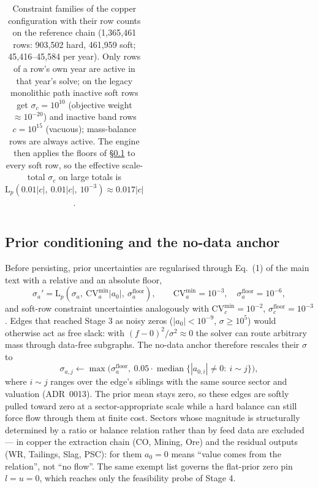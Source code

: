 \documentclass[11pt]{article}
\newcommand{\Lp}[1]{\mathrm{L}_p\!\left(#1\right)}
\begin{document}
\begin{table}[h]
\begin{tabular}{@{}p{3.1cm}p{1.5cm}p{4.3cm}p{4.2cm}r@{}}
\bottomrule
\end{tabular}
\caption{Constraint families of the copper configuration with their row
counts on the reference chain (1{,}365{,}461 rows: 903{,}502 hard, 461{,}959
soft; 45{,}416--45{,}584 per year). Only rows of a row's own year are active
in that year's solve; on the legacy monolithic path inactive soft rows get
$\sigma_c = 10^{10}$ (objective weight $\approx 10^{-20}$) and inactive band
rows $c = 10^{15}$ (vacuous); mass-balance rows are always active. The
engine then applies the floors of \S\ref{si:anchor} to every soft row, so
the effective scale-total $\sigma_c$ on large totals is
$\Lp{0.01|c|,\ 0.01|c|,\ 10^{-3}} \approx 0.017|c|$.}
\label{tab:si-constraints}
\end{table}

\subsection{Prior conditioning and the no-data anchor}\label{si:anchor}
Before persisting, prior uncertainties are regularised through Eq.~(1) of the
main text with a relative and an absolute floor,
\begin{equation}
\sigma_a' = \Lp{\sigma_a,\ \mathrm{CV}_a^{\min} |a_0|,\
\sigma_a^{\mathrm{floor}}},
\qquad
\mathrm{CV}_a^{\min} = 10^{-3},\quad \sigma_a^{\mathrm{floor}} = 10^{-6},
\end{equation}
and soft-row constraint uncertainties analogously with
$\mathrm{CV}_c^{\min}=10^{-2}$, $\sigma_c^{\mathrm{floor}}=10^{-3}$.
Edges that reached Stage 3 as noisy zeros ($|a_0| < 10^{-9}$, $\sigma \ge
10^{5}$) would otherwise act as free slack: with $(f-0)^2/\sigma^2 \approx 0$
the solver can route arbitrary mass through data-free subgraphs. The no-data
anchor therefore rescales their $\sigma$ to
\begin{equation}
\sigma_{a,j} \leftarrow \max\bigl(\sigma_a^{\mathrm{floor}},\
0.05 \cdot \operatorname{median}\{|a_{0,i}| \ne 0 :\ i \sim j\}\bigr),
\end{equation}
where $i \sim j$ ranges over the edge's siblings with the same source sector
and valuation (ADR~0013). The prior mean stays zero, so these edges are
softly pulled toward zero at a sector-appropriate scale while a hard balance
can still force flow through them at finite cost. Sectors whose magnitude is
structurally determined by a ratio or balance relation rather than by feed
data are excluded --- in copper the extraction chain (CO, Mining, Ore) and
the residual outputs (WR, Tailings, Slag, PSC): for them $a_0 = 0$ means
``value comes from the relation'', not ``no flow''. The same exempt list
governs the flat-prior zero pin $l = u = 0$, which reaches only the
feasibility probe of Stage 4.
\end{document}

